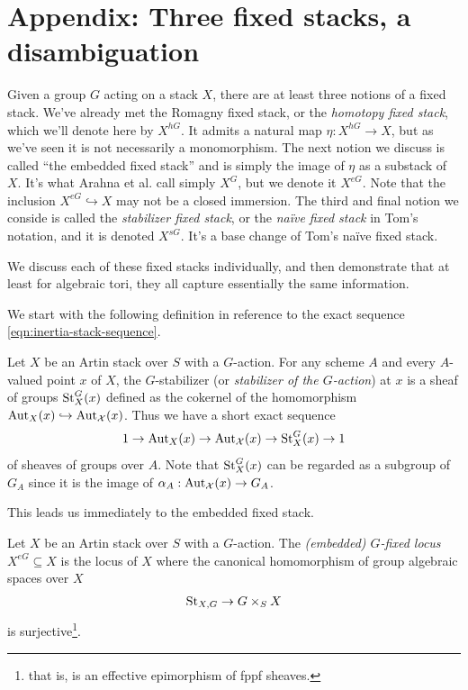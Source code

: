 \documentclass[12pt,dvipsnames]{amsart}
\begin{document}
\newpage

\section{Appendix: Three fixed stacks, a disambiguation}\label{rl-001A}

Given a group \(G\) acting on a stack \(X\), there are at least three notions of a fixed stack. We've already met the Romagny fixed stack, or the \emph{homotopy fixed stack}, which we'll denote here by \(X^{hG}\). It admits a natural map \(\eta:X^{hG}\to X\), but as we've seen it is not necessarily a monomorphism. The next notion we discuss is called ``the embedded fixed stack'' and is simply the image of $\eta$ as a substack of $X$. It's what Arahna et al. call simply $X^G$, but we denote it \(X^{eG}\). Note that the inclusion \(X^{eG}\hookrightarrow X\) may not be a closed immersion. The third and final notion we conside is called the \textit{stabilizer fixed stack}, or the \textit{na\"ive fixed stack} in Tom's notation, and it is denoted \(X^{sG}\). It's a base change of Tom's na\"ive fixed stack.

We discuss each of these fixed stacks individually, and then demonstrate that at least for algebraic tori, they all capture essentially the same information.

We start with the following definition in reference to the exact sequence \eqref{eqn:inertia-stack-sequence}.
\begin{definition}\label{rl-001B}
  Let \(X\) be an Artin stack over \(S\) with a \(G\)-action. For any scheme \(A\) and every \(A\)-valued point \(x\) of \(X\), the \(G\)-stabilizer (or \emph{stabilizer of the \(G\)-action}) at \(x\) is a sheaf of groups \(\operatorname{St}^G_X(x)\) defined as the cokernel of the homomorphism \(\operatorname{Aut}_X(x) \hookrightarrow \operatorname{Aut}_{\mathcal X}(x)\). Thus we have a short exact sequence
  \begin{align*}
    1 \to \operatorname{Aut}_X(x) \to \operatorname{Aut}_{\mathcal X}(x) \to \operatorname{St}^G_X(x) \to 1
  \end{align*}
  of sheaves of groups over \(A\). Note that \(\operatorname{St}^G_X(x)\) can be regarded as a subgroup of \(G_A\) since it is the image of \(\alpha_A:\operatorname{Aut}_{\mathcal X}(x) \to G_A\).
\end{definition}


This leads us immediately to the embedded fixed stack.

\begin{definition}\label{rl-001C}
\cite{aranha-khan-latyntsev-etal_VirtualLocalizationRevisited2025}
  Let \(X\) be an Artin stack over \(S\) with a \(G\)-action. The \emph{(embedded) \(G\)-fixed locus} \(X^{eG}\subseteq X\) is the locus of \(X\) where the canonical homomorphism of group algebraic spaces over \(X\)
  \begin{align*}
    \operatorname{St}_{X,G}\to G \times_S X
  \end{align*}
  is surjective\footnote{that is, is an effective epimorphism of fppf sheaves.}.
\end{definition}
\end{document}
